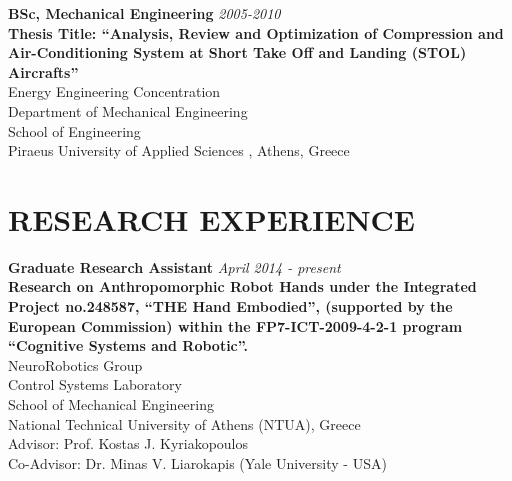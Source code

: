 \documentclass[11pt]{res} %
\begin{document}
\begin{resume}
\small\textbf{BSc, Mechanical Engineering} \hfill {\sl 2005-2010}  \\
\small\textbf{Thesis Title: ``Analysis, Review and Optimization of Compression and Air-Conditioning System at Short Take Off and Landing (STOL) Aircrafts''}\\
Energy Engineering Concentration\\%
Department of Mechanical Engineering%
\\%
School of Engineering%
\\%
Piraeus University of Applied Sciences%
, Athens, Greece 
 
\vspace{0.1in} %




\section{RESEARCH EXPERIENCE}

\vspace{8pt} %

\small\textbf{Graduate Research Assistant} \hfill {\sl April 2014 - present} \\\small\textbf{Research on Anthropomorphic Robot Hands under the Integrated Project no.248587,%
``THE Hand Embodied'', (supported by the
European Commission) within the FP7-ICT-2009-4-2-1 program ``Cognitive Systems and
Robotic''.}\\%
NeuroRobotics Group%
\\Control Systems Laboratory\\School of Mechanical Engineering\\National Technical University of Athens (NTUA), Greece\\Advisor: Prof. Kostas J. Kyriakopoulos\\Co-Advisor: Dr. Minas V. Liarokapis (Yale University - USA)
 

\end{resume}
\end{document}
